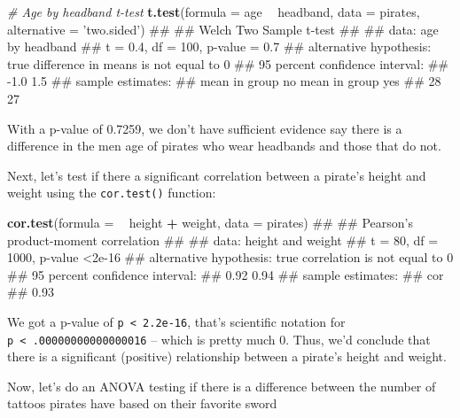 \documentclass[]{book}
\newenvironment{Shaded}{\begin{snugshade}}{\end{snugshade}}
\newcommand{\KeywordTok}[1]{\textcolor[rgb]{0.13,0.29,0.53}{\textbf{#1}}}
\newcommand{\DataTypeTok}[1]{\textcolor[rgb]{0.13,0.29,0.53}{#1}}
\newcommand{\StringTok}[1]{\textcolor[rgb]{0.31,0.60,0.02}{#1}}
\newcommand{\CommentTok}[1]{\textcolor[rgb]{0.56,0.35,0.01}{\textit{#1}}}
\newcommand{\OperatorTok}[1]{\textcolor[rgb]{0.81,0.36,0.00}{\textbf{#1}}}
\newcommand{\NormalTok}[1]{#1}
\theoremstyle{definition}
\theoremstyle{definition}
\theoremstyle{remark}
\begin{document}
\begin{Shaded}
\begin{Highlighting}[]
\CommentTok{# Age by headband t-test}
\KeywordTok{t.test}\NormalTok{(}\DataTypeTok{formula =}\NormalTok{ age }\OperatorTok{~}\StringTok{ }\NormalTok{headband,}
       \DataTypeTok{data =}\NormalTok{ pirates,}
       \DataTypeTok{alternative =} \StringTok{'two.sided'}\NormalTok{)}
\NormalTok{## }
\NormalTok{##  Welch Two Sample t-test}
\NormalTok{## }
\NormalTok{## data:  age by headband}
\NormalTok{## t = 0.4, df = 100, p-value = 0.7}
\NormalTok{## alternative hypothesis: true difference in means is not equal to 0}
\NormalTok{## 95 percent confidence interval:}
\NormalTok{##  -1.0  1.5}
\NormalTok{## sample estimates:}
\NormalTok{##  mean in group no mean in group yes }
\NormalTok{##                28                27}
\end{Highlighting}
\end{Shaded}

With a p-value of 0.7259, we don't have sufficient evidence say there is
a difference in the men age of pirates who wear headbands and those that
do not.

Next, let's test if there a significant correlation between a pirate's
height and weight using the \texttt{cor.test()} function:

\begin{Shaded}
\begin{Highlighting}[]
\KeywordTok{cor.test}\NormalTok{(}\DataTypeTok{formula =} \OperatorTok{~}\StringTok{ }\NormalTok{height }\OperatorTok{+}\StringTok{ }\NormalTok{weight,}
         \DataTypeTok{data =}\NormalTok{ pirates)}
\NormalTok{## }
\NormalTok{##  Pearson's product-moment correlation}
\NormalTok{## }
\NormalTok{## data:  height and weight}
\NormalTok{## t = 80, df = 1000, p-value <2e-16}
\NormalTok{## alternative hypothesis: true correlation is not equal to 0}
\NormalTok{## 95 percent confidence interval:}
\NormalTok{##  0.92 0.94}
\NormalTok{## sample estimates:}
\NormalTok{##  cor }
\NormalTok{## 0.93}
\end{Highlighting}
\end{Shaded}

We got a p-value of \texttt{p\ \textless{}\ 2.2e-16}, that's scientific
notation for \texttt{p\ \textless{}\ .00000000000000016} -- which is
pretty much 0. Thus, we'd conclude that there is a significant
(positive) relationship between a pirate's height and weight.

Now, let's do an ANOVA testing if there is a difference between the
number of tattoos pirates have based on their favorite sword
\end{document}
